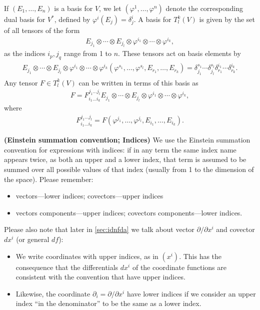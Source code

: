 \documentclass[12pt]{article} %
\newcommand{\bfs}[1]{\textbf{({#1}) }}
\begin{document}
If $\left(E_{1}, \ldots, E_{n}\right)$ is a basis for $V$, we let $\left(\varphi^{1}, \ldots, \varphi^{n}\right)$ denote the corresponding dual basis for $V^{*}$, defined by $\varphi^{i}\left(E_{j}\right)=\delta_{j}^{i}$. A basis for $T_{l}^{k}(V)$ is given by the set of all tensors of the form
\begin{align*}
E_{j_{1}} \otimes \cdots \otimes E_{j_{l}} \otimes \varphi^{i_{1}} \otimes \cdots \otimes \varphi^{i_{k}},
\end{align*}
as the indices $i_{p}, j_{q}$ range from 1 to $n$. These tensors act on basis elements by
\begin{align*}
\begin{aligned}
E_{j_{1}} \otimes \cdots \otimes E_{j_{l}} \otimes \varphi^{i_{1}} \otimes \cdots \otimes \varphi^{i_{k}}\left(\varphi^{s_{1}}, \ldots, \varphi^{s_{l}}, E_{r_{1}}, \ldots, E_{r_{k}}\right) =\delta_{j_{1}}^{s_{1}} \cdots \delta_{j_{l}}^{s_{l}} \delta_{r_{1}}^{i_{1}} \cdots \delta_{r_{k}}^{i_{k}} .
\end{aligned}
\end{align*}
Any tensor $F \in T_{l}^{k}(V)$ can be written in terms of this basis as
\begin{align*}
F=F_{i_{1} \ldots i_{k}}^{j_{1} \ldots j_{l}} E_{j_{1}} \otimes \cdots \otimes E_{j_{l}} \otimes \varphi^{i_{1}} \otimes \cdots \otimes \varphi^{i_{k}},
\end{align*}
where
\begin{align*}
F_{i_{1} \ldots i_{k}}^{j_{1} \ldots j_{l}}=F\left(\varphi^{j_{1}}, \ldots, \varphi^{j_{l}}, E_{i_{1}}, \ldots, E_{i_{k}}\right) .
\end{align*}
\begin{rema}\bfs{Einstein summation convention; Indices}\label{re:einstein}
We use the Einstein summation convention for expressions with indices: if in any term the same index name appears twice, as both an upper and a lower index, that term is assumed to be summed over all possible values of that index (usually from 1 to the dimension of the space). 
Please remember:
\begin{itemize}
    \item vectors---lower indices; covectors---upper indices
    \item vectors components---upper indices; covectors components---lower indices.
\end{itemize}
Please also note that later in \cref{sec:idnfda} we talk about vector $\partial / \partial x^{i}$ and covector $dx^{i}$ (or general $df$):
\begin{itemize}
    \item We write coordinates with upper indices, as in $\left(x^{i}\right)$. This has the consequence that the differentials $d x^{i}$ of the coordinate functions are consistent with the convention that  have upper indices. 
    \item Likewise, the coordinate  $\partial_{i}=\partial / \partial x^{i}$ have lower indices if we consider an upper index ``in the denominator'' to be the same as a lower index.
\end{itemize}
\end{rema}
\end{document}
